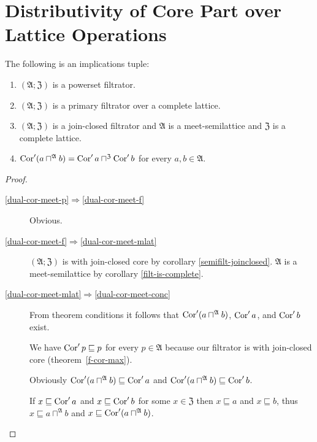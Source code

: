\section{Distributivity of Core Part over Lattice Operations}
\begin{thm}
\label{dual-cor-meet}The following is an implications tuple:
\begin{enumerate}
\item \label{dual-cor-meet-p}$(\mathfrak{A};\mathfrak{Z})$ is a powerset
filtrator.
\item \label{dual-cor-meet-f}$(\mathfrak{A};\mathfrak{Z})$ is a primary
filtrator over a complete lattice.
\item \label{dual-cor-meet-mlat}$(\mathfrak{A};\mathfrak{Z})$ is a join-closed
filtrator and $\mathfrak{A}$ is a meet-semilattice and $\mathfrak{Z}$
is a complete lattice.
\item \label{dual-cor-meet-conc}$\operatorname{Cor}'(a\sqcap^{\mathfrak{A}}b)=\operatorname{Cor}'a\sqcap^{\mathfrak{Z}}\operatorname{Cor}'b$
for every $a,b\in\mathfrak{A}$.
\end{enumerate}
\end{thm}
\begin{proof}
~
\begin{description}
\item [{\ref{dual-cor-meet-p}$\Rightarrow$\ref{dual-cor-meet-f}}] Obvious.
\item [{\ref{dual-cor-meet-f}$\Rightarrow$\ref{dual-cor-meet-mlat}}] $(\mathfrak{A};\mathfrak{Z})$
is with join-closed core by corollary \ref{semifilt-joinclosed}.
$\mathfrak{A}$ is a meet-semilattice by corollary \ref{filt-is-complete}.
\item [{\ref{dual-cor-meet-mlat}$\Rightarrow$\ref{dual-cor-meet-conc}}] From
theorem conditions it follows that $\operatorname{Cor}'(a\sqcap^{\mathfrak{A}}b)$, $\operatorname{Cor}'a$, and $\operatorname{Cor}'b$
exist.


We have $\operatorname{Cor}'p\sqsubseteq p$ for every $p\in\mathfrak{A}$ because
our filtrator is with join-closed core (theorem~\ref{f-cor-max}).


Obviously $\operatorname{Cor}'(a\sqcap^{\mathfrak{A}}b)\sqsubseteq\operatorname{Cor}'a$ and $\operatorname{Cor}'(a\sqcap^{\mathfrak{A}}b)\sqsubseteq\operatorname{Cor}'b$.


If $x\sqsubseteq\operatorname{Cor}'a$ and $x\sqsubseteq\operatorname{Cor}'b$ for some $x\in\mathfrak{Z}$
then $x\sqsubseteq a$ and $x\sqsubseteq b$, thus $x\sqsubseteq a\sqcap^{\mathfrak{A}}b$
and $x\sqsubseteq\operatorname{Cor}'(a\sqcap^{\mathfrak{A}}b)$.

\end{description}
\end{proof}
